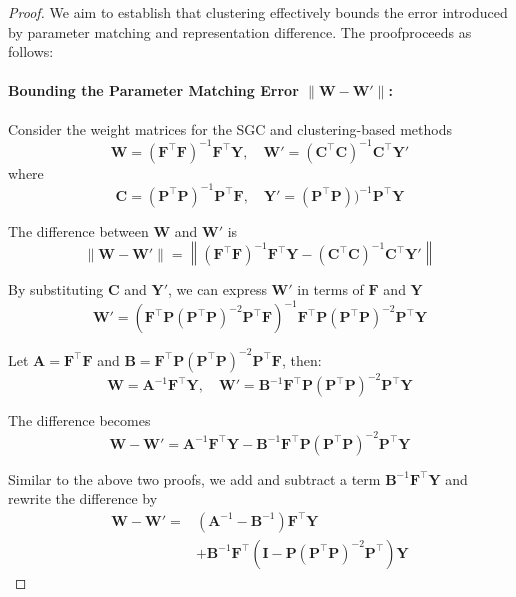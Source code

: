\begin{proof}
We aim to establish that clustering effectively bounds the error introduced by parameter matching and representation difference. The proofproceeds as follows:
\paragraph{Bounding the Parameter Matching Error \( \| \mathbf{W} - \mathbf{W}' \| \):}
Consider the weight matrices for the SGC and clustering-based methods
\[
\mathbf{W} = (\mathbf{F}^\top \mathbf{F})^{-1} \mathbf{F}^\top \mathbf{Y}, \quad \mathbf{W}' = (\mathbf{C}^\top \mathbf{C})^{-1} \mathbf{C}^\top \mathbf{Y}'
\]
where
\[
\mathbf{C} = (\mathbf{P}^\top\mathbf{P})^{-1} \mathbf{P}^\top \mathbf{F}, \quad \mathbf{Y}' = (\mathbf{P}^\top\mathbf{P}))^{-1} \mathbf{P}^\top \mathbf{Y}
\]

The difference between \( \mathbf{W} \) and \( \mathbf{W}' \) is
\[
\| \mathbf{W} - \mathbf{W}' \| = \left\| (\mathbf{F}^\top \mathbf{F})^{-1} \mathbf{F}^\top \mathbf{Y} - (\mathbf{C}^\top \mathbf{C})^{-1} \mathbf{C}^\top \mathbf{Y}' \right\|
\]

By substituting $\mathbf{C}$ and $\mathbf{Y}'$, we can express \( \mathbf{W}' \) in terms of \( \mathbf{F} \) and \( \mathbf{Y} \)
\[
\mathbf{W}' = \left( \mathbf{F}^\top \mathbf{P} (\mathbf{P}^\top\mathbf{P})^{-2} \mathbf{P}^\top \mathbf{F} \right)^{-1} \mathbf{F}^\top \mathbf{P} (\mathbf{P}^\top\mathbf{P})^{-2} \mathbf{P}^\top \mathbf{Y}
\]

Let \( \mathbf{A} = \mathbf{F}^\top \mathbf{F} \) and \( \mathbf{B} = \mathbf{F}^\top \mathbf{P} (\mathbf{P}^\top\mathbf{P})^{-2} \mathbf{P}^\top \mathbf{F} \), then:
\[
\mathbf{W} = \mathbf{A}^{-1} \mathbf{F}^\top \mathbf{Y}, \quad \mathbf{W}' = \mathbf{B}^{-1} \mathbf{F}^\top \mathbf{P} (\mathbf{P}^\top\mathbf{P})^{-2} \mathbf{P}^\top \mathbf{Y}
\]

The difference becomes
\[
\mathbf{W} - \mathbf{W}' = \mathbf{A}^{-1} \mathbf{F}^\top \mathbf{Y} - \mathbf{B}^{-1} \mathbf{F}^\top \mathbf{P} (\mathbf{P}^\top\mathbf{P})^{-2} \mathbf{P}^\top \mathbf{Y}
\]

Similar to the above two proofs, we add and subtract a term \( \mathbf{B}^{-1} \mathbf{F}^\top \mathbf{Y} \) and rewrite the difference by
\begin{align*}
        \mathbf{W} - \mathbf{W}' = &\left( \mathbf{A}^{-1} - \mathbf{B}^{-1} \right) \mathbf{F}^\top \mathbf{Y} \\
&+ \mathbf{B}^{-1} \mathbf{F}^\top \left( \mathbf{I} - \mathbf{P} (\mathbf{P}^\top\mathbf{P})^{-2} \mathbf{P}^\top \right) \mathbf{Y}
\end{align*}


\end{proof}

